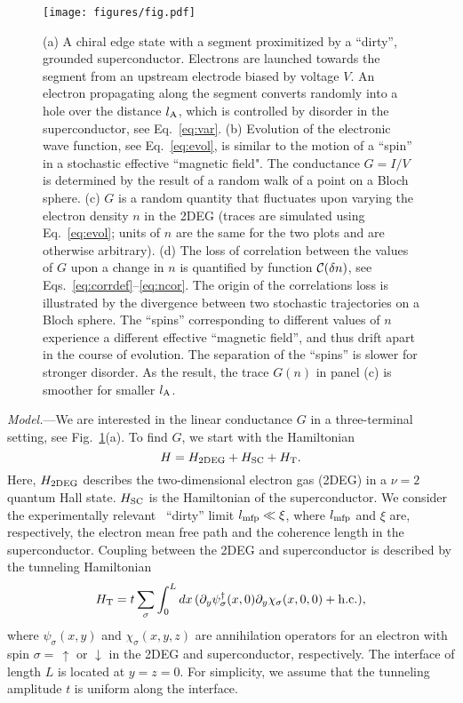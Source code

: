 \documentclass[reprint,
superscriptaddress,
amsmath,
amssymb,
aps,
prl,
floatfix,
english
]{revtex4-2}
\newcommand{\tdeg}{{\rm 2DEG}}
\newcommand{\SC}{{\rm SC}}
\newcommand{\T}{{\rm T}}
\newcommand{\lA}{l_{\rm A}}
\newcommand{\xic}{\xi}
\begin{document}
\begin{figure}[t]
  \begin{center}
    \texttt{[image: figures/fig.pdf]}
    \caption{
    (a) A chiral edge state with a segment proximitized by a ``dirty'', grounded superconductor. Electrons are launched towards the segment from an upstream electrode biased by voltage $V$. An electron propagating along the segment converts randomly into a hole over the distance $\lA$, which is controlled by disorder in the superconductor, see Eq.~\eqref{eq:var}.
    (b) Evolution of the electronic wave function, see Eq.~\eqref{eq:evol}, is similar to the motion of a ``spin'' in a stochastic effective ``magnetic field".
    The conductance $G = I / V$ is determined by the result of a random walk of a point on a Bloch sphere.
    (c) $G$ is a random quantity that fluctuates upon varying the electron density $n$ in the 2DEG (traces are simulated using Eq.~\eqref{eq:evol}; units of $n$ are the same for the two plots and are otherwise arbitrary).
    (d) The loss of correlation between the values of $G$ upon a change in $n$ is quantified by function ${\cal C}(\delta n)$, see Eqs.~\eqref{eq:corrdef}--\eqref{eq:ncor}. The origin of the correlations loss is illustrated by the divergence between two stochastic trajectories on a Bloch sphere.
    The ``spins'' corresponding to different values of $n$ experience a different effective ``magnetic field'', and thus drift apart in the course of evolution.
    The separation of the ``spins'' is slower for stronger disorder.
    As the result, the trace $G(n)$ in panel (c) is smoother for smaller $\lA$.
    \label{figure}}
  \end{center}
\end{figure}

\textit{Model.}---We are interested in the linear conductance $G$ in a three-terminal setting, see Fig.~\ref{figure}(a). 
To find $G$, we start with the Hamiltonian
\begin{equation}
    H = H_\tdeg + H_\SC + H_\T.
\end{equation}
Here, $H_\tdeg$ describes the two-dimensional electron gas (2DEG) in a $\nu = 2$ quantum Hall state. $H_\SC$ is the Hamiltonian of the superconductor.
We consider the experimentally relevant~\cite{lee2017,zhao2020,gul2021,hatefipour2021} ``dirty'' limit 
$l_{\rm mfp} \ll \xic$, where $l_{\rm mfp}$ and $\xic$ are, respectively, the electron mean free path and the coherence length in the superconductor.
Coupling between the 2DEG and superconductor is described by the tunneling Hamiltonian~\cite{prada2004, lutchyn2012}
\begin{equation}\label{eq:HT}
    H_\T = t \sum_{\sigma} \int_0^L dx\, (\partial_y \psi^\dagger_\sigma(x,0)\partial_y \chi_\sigma (x,0,0) + {\rm h.c.}),
\end{equation}
where $\psi_\sigma (x, y)$ and $\chi_\sigma (x,y,z)$ are annihilation operators for an electron with spin $\sigma =\,\uparrow$ or $\downarrow$ in the 2DEG and superconductor, respectively. 
The interface of length $L$ is located at $y = z = 0$. 
For simplicity, we assume that the tunneling amplitude $t$ is uniform along the interface. 
\end{document}
